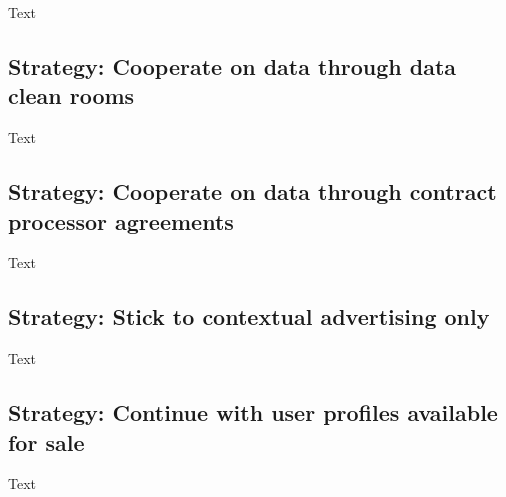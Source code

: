 Text

\subsection{Strategy: Cooperate on data through data clean rooms}

Text

\subsection{Strategy: Cooperate on data through contract processor agreements}

Text

\subsection{Strategy: Stick to contextual advertising only}

Text

\subsection{Strategy: Continue with user profiles available for sale}

Text

